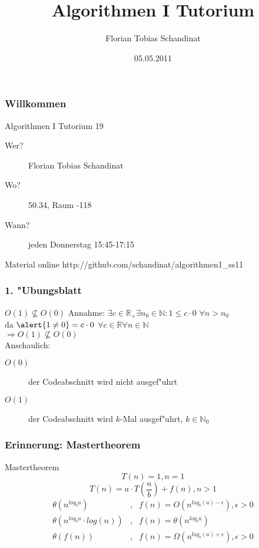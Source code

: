 \documentclass{beamer}
\title{Algorithmen I Tutorium}
\author{Florian Tobias Schandinat}
\date{05.05.2011}
\institute{FTS}
\begin{document}
\begin{frame}
\frametitle{Willkommen}
\begin{block}{Algorithmen I Tutorium 19}
\begin{description}
\item[Wer?] Florian Tobias Schandinat\\
\item[Wo?] 50.34, Raum -118\\
\item[Wann?] jeden Donnerstag 15:45-17:15
\end{description}
\end{block}

\begin{block}{Material online}
http://github.com/schandinat/algorithmen1\_ss11
\end{block}
\end{frame}


\begin{frame}
\frametitle{1. "Ubungsblatt}
\begin{block}{$O(1) \not\subseteq O(0)$}
\pause
Annahme: $\exists c \in \mathbb{R_+} \exists n_0 \in \mathbb{N}: 1 \leq c \cdot 0$ \hspace{0.5cm} $\forall n > n_0$\pause\\
da $\alert{1 \not= 0} = c \cdot 0$\hspace{0.5cm} $\forall c \in \mathbb{R} \forall n \in \mathbb{N}$\\
$\Longrightarrow O(1) \not\subseteq O(0)$\\[1cm]
\pause
Anschaulich:
\begin{description}
\item[$O(0)$] der Codeabschnitt wird \alert{nicht} ausgef"uhrt
\item[$O(1)$] der Codeabschnitt wird $k$-Mal ausgef"uhrt, $k \in \mathbb{N}_0$
\end{description}
\end{block}
\end{frame}


\begin{frame}
\frametitle{Erinnerung: Mastertheorem}
\begin{block}{Mastertheorem}
$$T(n) = 1, n = 1$$
$$T(n) = a \cdot T\left(\frac{n}{b}\right) + f(n), n > 1$$
\begin{eqnarray*}
\theta(n^{log_b a})&,& f(n) = O(n^{log_b(a)-\epsilon}), \epsilon > 0\\
\theta(n^{log_b a} \cdot log(n))&,& f(n) = \theta(n^{log_b a})\\
\theta(f(n))&,& f(n) = \Omega(n^{log_b (a)+\epsilon}), \epsilon > 0
\end{eqnarray*}
\end{block}
\end{frame}
\end{document}
